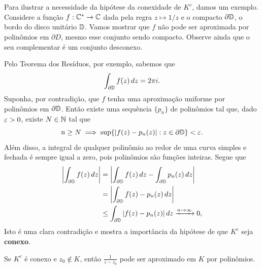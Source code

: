     \\ \\
    
    Para ilustrar a necessidade da hipótese da conexidade de $K^c$, damos um exemplo. 
    Considere a função $f: \mathbb{C}^* \to \mathbb{C}$ dada pela regra $z \mapsto 1/z$ e o compacto 
    $\partial \mathbb{D}$, o bordo do disco unitário  $\mathbb{D}$. Vamos mostrar que $f$ não
    pode ser aproximada por polinômios em $\partial D$, mesmo esse conjunto sendo compacto.
    Observe ainda que o seu complementar é um conjunto desconexo.
    
    Pelo Teorema dos Resíduos, por exemplo, sabemos que
    \begin{equation*}
        \int_{\partial \mathbb{D}}f(z) \, dz = 2 \pi i.
    \end{equation*}
    Suponha, por contradição, que $f$ tenha uma aproximação uniforme por polinômios em 
    $\partial \mathbb{D}$. Então existe uma sequência $\{p_n\}$ de polinômios tal que, 
    dado $\varepsilon > 0$, existe $N \in \mathbb{N}$ tal que
    \begin{equation*}
        n \geq N \implies \sup \{|f(z) - p_n(z)|: z \in \partial \mathbb{D}\} < \varepsilon.
    \end{equation*}
    Além disso, a integral de qualquer polinômio ao redor de uma curva simples e fechada é sempre
    igual a zero, pois polinômios são funções inteiras. Segue que
    \begin{align*}
        \left|\int_{\partial \mathbb{D}} f(z) \, dz\right| 
        &= \left|\int_{\partial \mathbb{D}} f(z) \, dz - \int_{\partial \mathbb{D}} p_n(z) \, dz\right| \\
        &= \left|\int_{\partial \mathbb{D}} f(z) - p_n(z)\, dz\right| \\
        &\leq \int_{\partial \mathbb{D}}|f(z) - p_n(z)| \, dz \xrightarrow{n\to\infty} 0,
    \end{align*}
    Isto é uma clara contradição e mostra a importância da hipótese de que $K^c$ seja {\bf conexo}.
    \begin{lema}
    \label{LR3}
        Se $K^c$ é conexo e $z_0 \not \in K$, então $\displaystyle{\frac{1}{z-z_0}}$ 
        pode ser aproximado em $K$ por polinômios.
    \end{lema}
